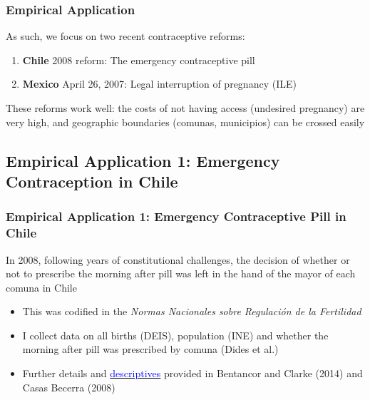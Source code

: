 \documentclass[10pt,letterpaper,subeqn]{beamer}
\begin{document}
\begin{frame}[label=empir2]
  \frametitle{Empirical Application}
As such, we focus on two recent contraceptive reforms:
\vspace{6mm}
\begin{enumerate}
\item \textbf{Chile} 2008 reform: The emergency contraceptive pill
\item \textbf{Mexico} April 26, 2007: Legal interruption of pregnancy (ILE)
\end{enumerate}
\vspace{6mm}
These reforms work well: the costs of not having access (undesired pregnancy) are
very high, and geographic boundaries (comunas, municipios) can be crossed easily
\end{frame}


\subsection{Empirical Application 1: Emergency Contraception in Chile}
\begin{frame}[label=empirA]
  \frametitle{Empirical Application 1: Emergency Contraceptive Pill in Chile} 
In 2008, following years of constitutional challenges, the decision of whether
or not to prescribe the morning after pill was left in the hand of the mayor of
each comuna in Chile
\vspace{5mm}
\begin{itemize}
\item This was codified in the \emph{Normas Nacionales sobre Regulaci\'on de la 
Fertilidad}
\item I collect data on all births (DEIS), population (INE) and whether the 
morning after pill was prescribed by comuna (Dides et al.)
\item Further details and \hyperlink{ChileDesc}{\textcolor{blue}{descriptives}} provided 
in Bentancor and Clarke (2014) and Casas Becerra (2008)
\end{itemize}
\end{frame}
\end{document}
